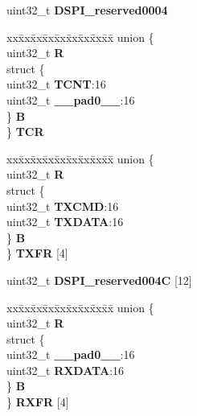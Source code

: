 \begin{DoxyCompactItemize}
\begin{tabbing}
\end{tabbing}\item 
\mbox{\label{structDSPI__tag_ae438bedcc96dc52fdb3e5672d32b9b04}} 
uint32\+\_\+t {\bfseries D\+S\+P\+I\+\_\+reserved0004}
\item 
\mbox{\label{structDSPI__tag_aad3463b4b609637c74ce0abd771681bc}} 
\begin{tabbing}
xx\=xx\=xx\=xx\=xx\=xx\=xx\=xx\=xx\=\kill
union \{\\
\>uint32\_t {\bfseries R}\\
\>struct \{\\
\>\>uint32\_t {\bfseries TCNT}:16\\
\>\>uint32\_t {\bfseries \_\_pad0\_\_}:16\\
\>\} {\bfseries B}\\
\} {\bfseries TCR}\\

\end{tabbing}\item 
\mbox{\label{structDSPI__tag_a698af123ab6a57552471b52192755171}} 
\begin{tabbing}
xx\=xx\=xx\=xx\=xx\=xx\=xx\=xx\=xx\=\kill
union \{\\
\>uint32\_t {\bfseries R}\\
\>struct \{\\
\>\>uint32\_t {\bfseries TXCMD}:16\\
\>\>uint32\_t {\bfseries TXDATA}:16\\
\>\} {\bfseries B}\\
\} {\bfseries TXFR} \mbox{[}4\mbox{]}\\

\end{tabbing}\item 
\mbox{\label{structDSPI__tag_a06b70caab5e49f01ee780d51c60dbab2}} 
uint32\+\_\+t {\bfseries D\+S\+P\+I\+\_\+reserved004C} \mbox{[}12\mbox{]}
\item 
\mbox{\label{structDSPI__tag_a5c3dfee102b3404777c8b60b080b4570}} 
\begin{tabbing}
xx\=xx\=xx\=xx\=xx\=xx\=xx\=xx\=xx\=\kill
union \{\\
\>uint32\_t {\bfseries R}\\
\>struct \{\\
\>\>uint32\_t {\bfseries \_\_pad0\_\_}:16\\
\>\>uint32\_t {\bfseries RXDATA}:16\\
\>\} {\bfseries B}\\
\} {\bfseries RXFR} \mbox{[}4\mbox{]}\\


\end{tabbing}
\end{DoxyCompactItemize}
